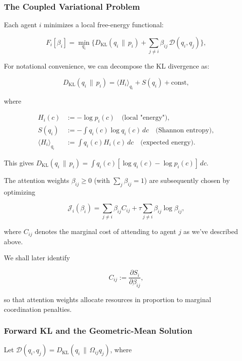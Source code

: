 \documentclass[11pt]{article}
\begin{document}
\subsubsection{The Coupled Variational Problem}
Each agent $i$ minimizes a local free-energy functional:

\begin{equation}
F_i[\beta_i]
=\min_{q_i}
\Big\{
D_{\mathrm{KL}}(q_i \,\|\, p_i)
+ \sum_{j\neq i} \beta_{ij}\,\mathcal{D}(q_i,q_j)
\Big\},
\label{eq:F_i}
\end{equation}

For notational convenience, we can decompose the KL divergence as:

\begin{equation}
D_{\mathrm{KL}}(q_i \,\|\, p_i) = \langle H_i \rangle_{q_i} + S(q_i) + \text{const},
\end{equation}

where

\begin{align}
H_i(c) &:= -\log p_i(c) \quad \text{(local "energy")}, \\
S(q_i) &:= -\int q_i(c) \log q_i(c)\,dc \quad \text{(Shannon entropy)}, \\
\langle H_i \rangle_{q_i} &:= \int q_i(c) H_i(c)\,dc \quad \text{(expected energy)}.
\end{align}

This gives $D_{\mathrm{KL}}(q_i \,\|\, p_i) = \int q_i(c)[\log q_i(c) - \log p_i(c)]\,dc$.

The attention weights $\beta_{ij}\ge 0$ (with $\sum_j \beta_{ij}=1$) are subsequently chosen by optimizing

\begin{equation}
\mathcal{J}_i(\beta_i)
=\sum_{j\neq i}\beta_{ij} C_{ij}
+ \tau \sum_{j\neq i}\beta_{ij}\log\beta_{ij},
\label{eq:J_i}
\end{equation}

where $C_{ij}$ denotes the marginal cost of attending to agent $j$ as we've described above.

We shall later identify

\begin{equation}
C_{ij} := \frac{\partial S_i}{\partial \beta_{ij}},
\end{equation}

so that attention weights allocate resources in proportion to marginal coordination penalties.

\subsubsection{Forward KL and the Geometric-Mean Solution}
Let $\mathcal{D}(q_i,q_j) = D_{\mathrm{KL}}(q_i \,\|\, \Omega_{ij} q_j)$, where
\end{document}
